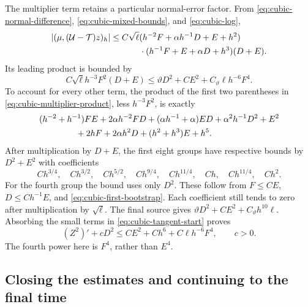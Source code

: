 \documentclass[11pt,a4paper]{article}
\numberwithin{equation}{section}
\theoremstyle{remark}
\begin{document}
The multiplier term retains a particular normal-error factor. From
\eqref{eq:cubic-normal-difference}, \eqref{eq:cubic-mixed-bounds},
and \eqref{eq:cubic-log},
\begin{equation}\label{eq:cubic-multiplier-product}
 \begin{split}
 |(\mu,(\mathcal U-\mathcal T)z)_h|
 &\leq C\sqrt\ell(h^{-2}F+\alpha h^{-1}D+E+h^2)\\
 &\hspace{12mm}\cdot(h^{-1}F+E+\alpha D+h^3)(D+E).
 \end{split}
\end{equation}
Its leading product is bounded by
\begin{equation}\label{eq:cubic-critical}
 C\sqrt\ell h^{-3}F^2(D+E)
    \leq\vartheta D^2+CE^2+C_\vartheta\ell h^{-6}F^4.
\end{equation}
To account for every other term, the product of the first two
parentheses in \eqref{eq:cubic-multiplier-product}, less
\(h^{-3}F^2\), is exactly
\[
 \begin{split}
 &(h^{-2}+h^{-1})FE+2\alpha h^{-2}FD
 +(\alpha h^{-1}+\alpha)ED+\alpha^2h^{-1}D^2+E^2\\
 &\hspace{15mm}+2hF+2\alpha h^2D+(h^2+h^3)E+h^5.
 \end{split}
\]
After multiplication by \(D+E\), the first eight groups have respective
bounds by \(D^2+E^2\) with coefficients
\[
 C h^{3/4},\quad C h^{3/2},\quad C h^{5/2},\quad C h^{9/4},
 \quad C h^{11/4},\quad Ch,\quad C h^{11/4},\quad Ch^2.
\]
For the fourth group the bound uses only \(D^2\). These follow from
\(F\leq CE\), \(D\leq Ch^{-1}E\), and
\eqref{eq:cubic-first-bootstrap}. Each coefficient still tends to zero
after multiplication by \(\sqrt\ell\). The final source gives
\(\vartheta D^2+CE^2+C_\vartheta h^{10}\ell\). Absorbing the
small terms in \eqref{eq:cubic-tangent-start} proves
\begin{equation}\label{eq:cubic-tangent-energy}
                 (Z^2)'+cD^2\leq CE^2+Ch^6+C\ell h^{-6}F^4,
                 \qquad c>0.
\end{equation}
The fourth power here is \(F^4\), rather than \(E^4\).

\subsection{Closing the estimates and continuing to the final time}
\end{document}
